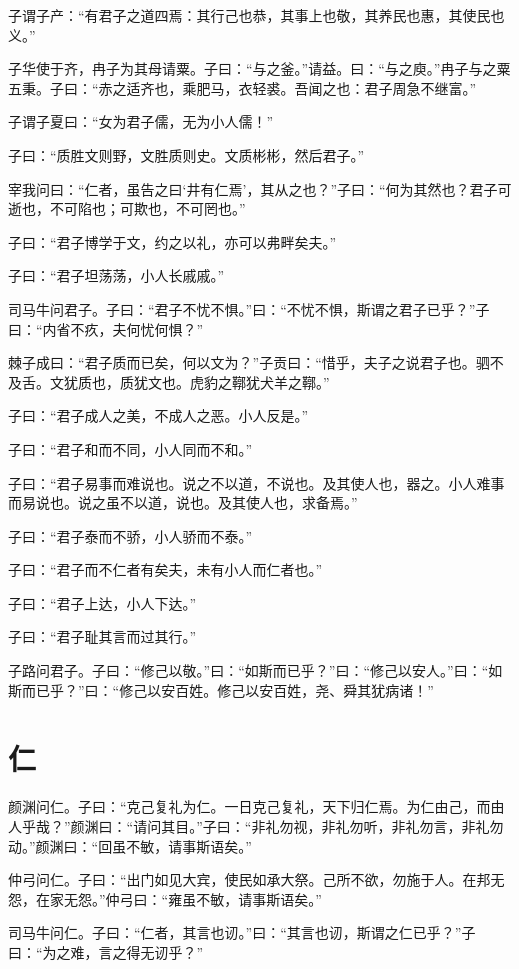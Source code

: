 \documentclass[a5paper]{ctexbook}
\begin{document}
    子谓子产：“有君子之道四焉：其行己也恭，其事上也敬，其养民也惠，其使民也义。”

    子华使于齐，冉子为其母请粟。子曰：“与之釜。”请益。曰：“与之庾。”冉子与之粟五秉。子曰：“赤之适齐也，乘肥马，衣轻裘。吾闻之也：君子周急不继富。”

    子谓子夏曰：“女为君子儒，无为小人儒！”

    子曰：“质胜文则野，文胜质则史。文质彬彬，然后君子。”

    宰我问曰：“仁者，虽告之曰‘井有仁焉’，其从之也？”子曰：“何为其然也？君子可逝也，不可陷也；可欺也，不可罔也。”

    子曰：“君子博学于文，约之以礼，亦可以弗畔矣夫。”

    子曰：“君子坦荡荡，小人长戚戚。”

    司马牛问君子。子曰：“君子不忧不惧。”曰：“不忧不惧，斯谓之君子已乎？”子曰：“内省不疚，夫何忧何惧？”

    棘子成曰：“君子质而已矣，何以文为？”子贡曰：“惜乎，夫子之说君子也。驷不及舌。文犹质也，质犹文也。虎豹之鞹犹犬羊之鞹。”

    子曰：“君子成人之美，不成人之恶。小人反是。”

    子曰：“君子和而不同，小人同而不和。”

    子曰：“君子易事而难说也。说之不以道，不说也。及其使人也，器之。小人难事而易说也。说之虽不以道，说也。及其使人也，求备焉。”

    子曰：“君子泰而不骄，小人骄而不泰。”

    子曰：“君子而不仁者有矣夫，未有小人而仁者也。”

    子曰：“君子上达，小人下达。”

    子曰：“君子耻其言而过其行。”

    子路问君子。子曰：“修己以敬。”曰：“如斯而已乎？”曰：“修己以安人。”曰：“如斯而已乎？”曰：“修己以安百姓。修己以安百姓，尧、舜其犹病诸！”

    \chapter{仁}

    颜渊问仁。子曰：“克己复礼为仁。一日克己复礼，天下归仁焉。为仁由己，而由人乎哉？”颜渊曰：“请问其目。”子曰：“非礼勿视，非礼勿听，非礼勿言，非礼勿动。”颜渊曰：“回虽不敏，请事斯语矣。”

    仲弓问仁。子曰：“出门如见大宾，使民如承大祭。己所不欲，勿施于人。在邦无怨，在家无怨。”仲弓曰：“雍虽不敏，请事斯语矣。”

    司马牛问仁。子曰：“仁者，其言也讱。”曰：“其言也讱，斯谓之仁已乎？”子曰：“为之难，言之得无讱乎？”
\end{document}
